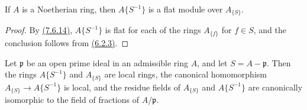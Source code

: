 \begin{prop}[7.6.16]
\label{0.7.6.16}
If $A$ is a Noetherian ring, then $A\{S^{-1}\}$ is a flat module over $A_{\{S\}}$.
\end{prop}

\begin{proof}
\label{proof-0.7.6.16}
By \hyperref[0.7.6.14]{(7.6.14)}, $A\{S^{-1}\}$ is flat for each of the rings $A_{\{f\}}$ for
$f\in S$, and the conclusion follows from \hyperref[0.6.2.3]{(6.2.3)}.
\end{proof}

\begin{prop}[7.6.17]
\label{0.7.6.17}
Let $\mathfrak{p}$ be an open prime ideal in an admissible ring $A$, and let $S=A-\mathfrak{p}$.
Then the rings $A\{S^{-1}\}$ and $A_{\{S\}}$ are local rings, the canonical homomorphism
$A_{\{S\}}\to A\{S^{-1}\}$ is local, and the residue fields of $A_{\{S\}}$ and $A\{S^{-1}\}$ are
canonically isomorphic to the field of fractions of $A/\mathfrak{p}$.
\end{prop}

